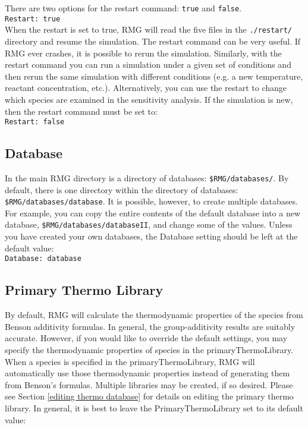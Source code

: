 \documentclass[12pt,letterpaper]{article}
\begin{document}
There are two options for the restart command: \texttt{true} and \texttt{false}.\\

\texttt{Restart: true} \\

When the restart is set to true, RMG will read the five files in the \texttt{./restart/}
directory and resume the simulation. The restart command can be very
useful. If RMG ever crashes, it is possible to rerun the simulation. Similarly,
with the restart command you can run a simulation under a given set of
conditions and then rerun the same simulation with different conditions (e.g.
a new temperature, reactant concentration, etc.). Alternatively, you can use
the restart to change which species are examined in the sensitivity analysis.
If the simulation is new, then the restart command must be set to:\\

\texttt{Restart: false}

\subsection{Database}

In the main RMG directory is a directory of databases: \texttt{\$RMG/databases/}.
By default, there is one directory within the directory of databases: \texttt{\$RMG/databases/database}.
It is possible, however, to create multiple databases. For example, you
can copy the entire contents of the default database into a new database,
\texttt{\$RMG/databases/databaseII}, and change some of the values.
Unless you have created your own databases, the Database setting should
be left at the default value: \\

\texttt{Database: database}

\subsection{Primary Thermo Library}\label{primary thermo library}

By default, RMG will calculate the thermodynamic properties of the species
from Benson additivity formulas. In general, the group-additivity results are
suitably accurate. However, if you would like to override the default settings,
you may specify the thermodynamic properties of species in the primaryThermoLibrary.
When a species is specified in the primaryThermoLibrary, RMG
will automatically use those thermodynamic properties instead of generating
them from Benson's formulas. Multiple libraries may be created, if so desired.
Please see Section \ref{editing thermo database} for details on editing the primary thermo library.
In general, it is best to leave the PrimaryThermoLibrary set to its default
value:\\
\end{document}
